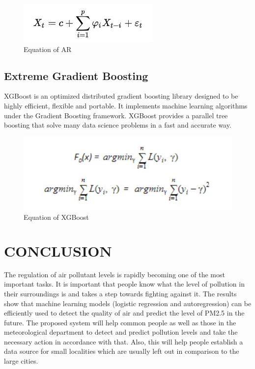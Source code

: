 \begin{figure}[h]
	\label{ss}    %
	\centering
	\includegraphics[width= 11 cm]{9.jpg}
	\caption{ Equation of AR }
\end{figure}	


\section{Extreme Gradient Boosting}

XGBoost is an optimized distributed gradient boosting library designed to be highly efficient, flexible and portable. It implements machine learning algorithms under the Gradient Boosting framework. XGBoost provides a parallel tree boosting that solve many data science problems in a fast and accurate way. 


\begin{figure}[h]
	\label{ss}    %
	\centering
	\includegraphics[width= 11 cm]{10.jpg}
	\caption{ Equation of XGBoost }
\end{figure}	

\chapter{CONCLUSION}

The regulation of air pollutant levels is rapidly becoming one of the most important tasks. It is important that people know what the level of pollution in their surroundings is and takes a step towards fighting against it. The results show that machine learning models (logistic regression and autoregression) can be efficiently used to detect the quality of air and predict the level of PM2.5 in the future. The proposed system will help common people as well as those in the meteorological department to detect and predict pollution levels and take the necessary action in accordance with that. Also, this will help people establish a data source for small localities which are usually left out in comparison to the large cities.


